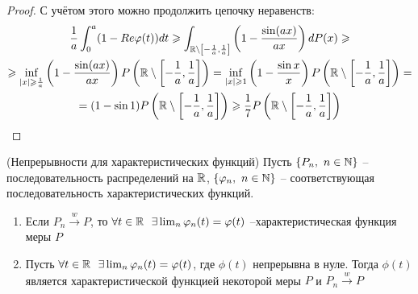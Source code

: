 \begin{proof}
    С учётом этого можно продолжить цепочку неравенств:
    \begin{multline*}
        \frac{1}{a} \int_0^a (1-Re\varphi(t)) dt \geqslant \int_{\mathbb{R} \setminus \left[ -\frac{1}{a}, \frac{1}{a} \right]} \left( 1 - \frac{\sin(ax)}{ax} \right) dP(x) \geqslant
        \\
        \geqslant \inf_{|x| \geqslant \frac{1}{a}} \left( 1 - \frac{\sin(ax)}{ax} \right) P \left( \mathbb{R} \setminus \left[ -\frac{1}{a}, \frac{1}{a} \right] \right) = \inf_{|x| \geqslant 1} \left( 1 - \frac{\sin x}{x} \right) P \left( \mathbb{R} \setminus \left[ -\frac{1}{a}, \frac{1}{a} \right] \right) =
        \\
        = (1 - \sin 1) P \left( \mathbb{R} \setminus \left[ -\frac{1}{a}, \frac{1}{a} \right] \right) \geqslant \frac{1}{7} P \left( \mathbb{R} \setminus \left[ -\frac{1}{a}, \frac{1}{a} \right] \right)
    \end{multline*}
\end{proof}

\begin{theorem} (Непрерывности для характеристических функций)
    Пусть $\{P_n,\ n \in \mathbb{N}\}$ -- последовательность распределений на $\mathbb{R}$, $\{\varphi_n,\ n \in \mathbb{N}\}$ -- соответствующая последовательность характеристических функций.
    \begin{enumerate}
        \item Если $P_n \xrightarrow{w} P$, то $\forall t \in \mathbb{R} \ \ \exists \lim_n \varphi_n(t) = \varphi(t)$ --характеристическая функция меры $P$
        \item Пусть $\forall t \in \mathbb{R} \ \ \exists \lim_n \varphi_n(t) = \varphi(t)$, где $\phi(t)$ непрерывна в нуле. Тогда $\phi(t)$ является характеристической функцией некоторой меры $P$ и $P_n \xrightarrow{w} P$
    \end{enumerate}
\end{theorem}

